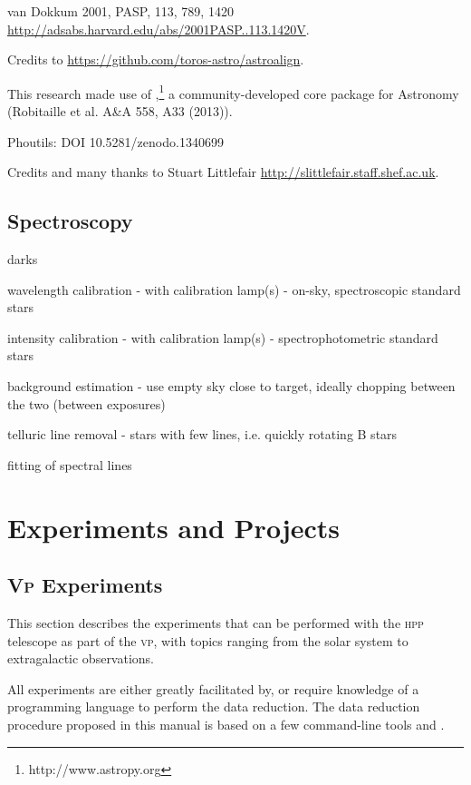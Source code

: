 \documentclass[a4paper, 11pt, fleqn]{memoir}
\begin{document}
van Dokkum 2001, PASP, 113, 789, 1420
\url{http://adsabs.harvard.edu/abs/2001PASP..113.1420V}.

Credits to \url{https://github.com/toros-astro/astroalign}.

This research made use of ,\footnote{http://www.astropy.org} a community-developed core  package for Astronomy (Robitaille et al.
A\&A 558, A33 (2013)).

Phoutils: DOI 10.5281/zenodo.1340699

Credits and many thanks to Stuart Littlefair \url{http://slittlefair.staff.shef.ac.uk}.

\chapter{Spectroscopy}

darks

wavelength calibration - with calibration lamp(s) - on-sky, spectroscopic
standard stars

intensity calibration - with calibration lamp(s) - spectrophotometric standard
stars

background estimation - use empty sky close to target, ideally chopping between
the two (between exposures)

telluric line removal - stars with few lines, i.e. quickly rotating B stars

fitting of spectral lines

\part{Experiments and Projects}

\chapter{\textsc{Vp}
  Experiments}

This section describes the experiments that can be performed with the \textsc{hpp} telescope as part of the \textsc{vp}, with topics ranging from the solar system to extragalactic observations.

All experiments are either greatly facilitated by, or require knowledge of a programming language to perform the data reduction.
The data reduction procedure proposed in this manual is based on a few command-line tools and .
\end{document}
